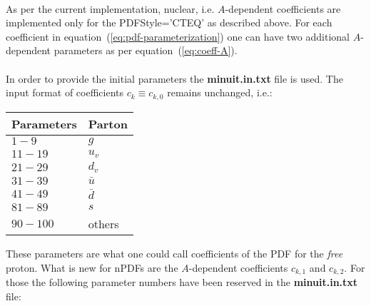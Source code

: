 \documentclass{article}
\begin{document}
\\
As per the current implementation, nuclear, i.e. $A$-dependent coefficients are implemented only for the PDFStyle='CTEQ' as described above. For each coefficient in equation~(\ref{eq:pdf-parameterization}) one can have two additional $A$-dependent parameters as per equation~(\ref{eq:coeff-A}).\\
\\
In order to provide the initial parameters the \textbf{minuit.in.txt} file is used. The input format of coefficients $c_k \equiv c_{k,0}$ remains unchanged, i.e.:\\ 

\begin{tabular}[h!]{ll}
Parameters & Parton \\ \hline
$1-9$ & $g$ \\
$11-19$ & $u_v$\\
$21-29$ & $d_v$\\
$31-39$ & $\bar{u}$\\
$41-49$ & $\bar{d}$\\
$81-89$ &$s$\\
$90-100$ & others
\end{tabular}
\vskip 0.2in

\noindent These parameters are what one could call coefficients of the PDF for the \textit{free} proton.
What is new for nPDFs are the $A$-dependent coefficients $c_{k,1}$ and $c_{k,2}$. For those the following parameter numbers have been reserved in the \textbf{minuit.in.txt} file:\\
\end{document}
